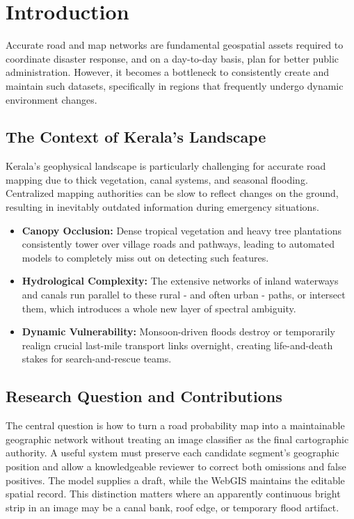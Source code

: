 \documentclass[10pt,a4paper,twocolumn]{article}
\begin{document}
\section{Introduction}
Accurate road and map networks are fundamental geospatial assets required to coordinate disaster response, and on a day-to-day basis, plan for better public administration. However, it becomes a bottleneck to consistently create and maintain such datasets, specifically in regions that frequently undergo dynamic environment changes.

\subsection{The Context of Kerala's Landscape}
Kerala's geophysical landscape is particularly challenging for accurate road mapping due to thick vegetation, canal systems, and seasonal flooding. Centralized mapping authorities can be slow to reflect changes on the ground, resulting in inevitably outdated information during emergency situations. 
\begin{itemize}
    \item \textbf{Canopy Occlusion:} Dense tropical vegetation and heavy tree plantations consistently tower over village roads and pathways, leading to automated models to completely miss out on detecting such features.
    \item \textbf{Hydrological Complexity:} The extensive networks of inland waterways and canals run parallel to these rural - and often urban - paths, or intersect them, which introduces a whole new layer of spectral ambiguity.
    \item \textbf{Dynamic Vulnerability:} Monsoon-driven floods destroy or temporarily realign crucial last-mile transport links overnight, creating life-and-death stakes for search-and-rescue teams.
\end{itemize}

\subsection{Research Question and Contributions}
The central question is how to turn a road probability map into a maintainable geographic network without treating an image classifier as the final cartographic authority. A useful system must preserve each candidate segment's geographic position and allow a knowledgeable reviewer to correct both omissions and false positives. The model supplies a draft, while the WebGIS maintains the editable spatial record. This distinction matters where an apparently continuous bright strip in an image may be a canal bank, roof edge, or temporary flood artifact.
\end{document}
